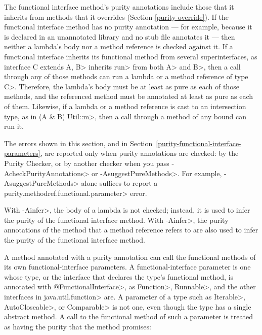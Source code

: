 \noindent
The functional interface method's purity annotations include those that it
inherits from methods that it overrides
(Section \ref{purity-override}).  If the functional interface method has no
purity annotation --- for example, because it is declared in an unannotated
library and no stub file annotates it --- then neither a lambda's body nor
a method reference is checked against it.  If a functional interface
inherits its functional method from several superinterfaces, as
\<interface C extends A, B> inherits \<run> from both \<A> and \<B>, then
a call through any of those methods can run a lambda or a method reference
of type \<C>.  Therefore, the lambda's body must be at least as pure as
each of those methods, and the referenced method must be annotated at least
as pure as each of them.  Likewise, if a lambda or a method reference is
cast to an intersection type, as in \<(A \& B) Util::m>, then a call through
a method of any bound can run it.

The errors shown in this section, and in
Section~\ref{purity-functional-interface-parameters}, are reported only when
purity annotations are checked:  by the Purity Checker, or by another checker
when you pass \<-AcheckPurityAnnotations> or \<-AsuggestPureMethods>.  For
example, \<-AsuggestPureMethods> alone suffices to report a
\<purity.methodref.functional.parameter> error.

With \<-Ainfer>, the body of a lambda is not
checked; instead, it is used to infer the purity of the functional interface
method.  With \<-Ainfer>, the purity annotations of the method that a method
reference refers to are also used to infer the purity of the functional
interface method.



A method annotated with a purity annotation can call the functional methods
of its own functional-interface parameters.  A functional-interface parameter
is one whose type, or the interface that declares the type's functional method,
is annotated with \<@FunctionalInterface>, as \<Function>, \<Runnable>, and
the other interfaces in \<java.util.function> are.  A parameter of a type such
as \<Iterable>, \<AutoCloseable>, or \<Comparable> is not one, even though the
type has a single abstract method.  A call to the functional method of such a
parameter is treated as having the purity that the method promises:


